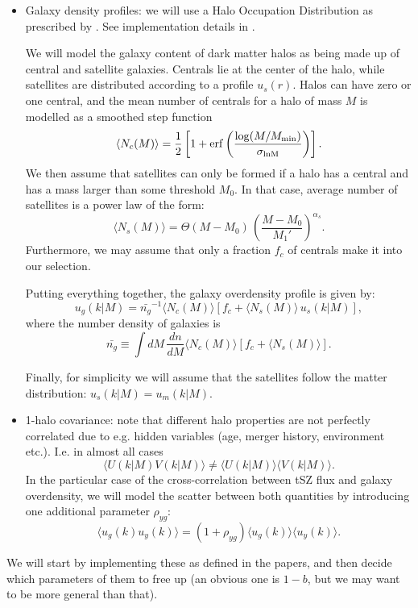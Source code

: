 \documentclass{article}
\begin{document}
\begin{itemize}
\item Galaxy density profiles: we will use a Halo Occupation Distribution as prescribed by \cite{2005ApJ...633..791Z,2011ApJ...736...59Z}. See implementation details in \cite{2017MNRAS.470.2100K}.

  We will model the galaxy content of dark matter halos as being made up of central and satellite galaxies. Centrals lie at the center of the halo, while satellites are distributed according to a profile $u_s(r)$. Halos can have zero or one central, and the mean number of centrals for a halo of mass $M$ is modelled as a smoothed step function
  \begin{equation}
    \langle N_c(M)\rangle=\frac{1}{2}\left[1+{\rm erf}\left(\frac{\log(M/M_{\rm min})}{\sigma_{\rm lnM}}\right)\right].
  \end{equation}
  We then assume that satellites can only be formed if a halo has a central and has a mass larger than some threshold $M_0$. In that case, average number of satellites is a power law of the form:
  \begin{equation}
    \langle N_s(M)\rangle=\Theta(M-M_0)\,\left(\frac{M-M_0}{M_1'}\right)^{\alpha_s}.
  \end{equation}
  Furthermore, we may assume that only a fraction $f_c$ of centrals make it into our selection.

  Putting everything together, the galaxy overdensity profile is given by:
  \begin{equation}
    u_g(k|M)=\bar{n_g}^{-1}\langle N_c(M)\rangle\left[f_c+\langle N_s(M)\rangle\,u_s(k|M)\right],
  \end{equation}
  where the number density of galaxies is
  \begin{equation}
    \bar{n_g}\equiv\int dM\,\frac{dn}{dM}\langle N_c(M)\rangle\left[f_c+\langle N_s(M)\rangle\right].
  \end{equation}

  Finally, for simplicity we will assume that the satellites follow the matter distribution: $u_s(k|M)=u_m(k|M)$.

\item 1-halo covariance: note that different halo properties are not perfectly correlated due to e.g. hidden variables (age, merger history, environment etc.). I.e. in almost all cases
  \begin{equation}
    \langle U(k|M) V(k|M)\rangle\neq\langle U(k|M)\rangle\langle V(k|M)\rangle.
  \end{equation}
  In the particular case of the cross-correlation between tSZ flux and galaxy overdensity, we will model the scatter between both quantities by introducing one additional parameter $\rho_{yg}$:
  \begin{equation}
    \langle u_g(k) u_y(k)\rangle = (1+\rho_{yg})\langle u_g(k)\rangle \langle u_y(k)\rangle.
  \end{equation}
\end{itemize}
We will start by implementing these as defined in the papers, and then decide which parameters of them to free up (an obvious one is $1-b$, but we may want to be more general than that).
\end{document}
